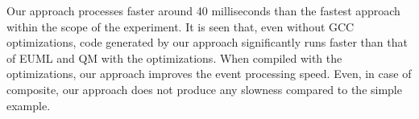 Our approach processes faster around 40 milliseconds than the fastest approach within the scope of the experiment.
It is seen that, even without GCC optimizations, code generated by our approach significantly runs faster than that of EUML and QM with the optimizations. 
When compiled with the optimizations, our approach improves the event processing speed. 
Even, in case of composite, our approach does not produce any slowness compared to the simple example. 

